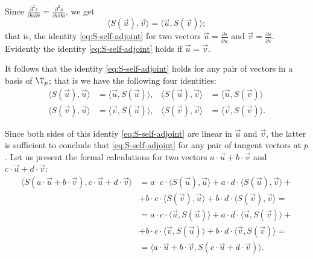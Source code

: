 Since $\tfrac{\partial^2 s}{\partial u\partial v}=\tfrac{\partial^2 s}{\partial v\partial u}$, we get
\[\langle S({\vec u}),\vec v\rangle=\langle {\vec u},S(\vec v)\rangle;\]
that is, the identity \ref{eq:S-self-adjoint} for two vectors $\vec u=\tfrac{\partial s}{\partial u}$ and $\vec v=\tfrac{\partial s}{\partial v}$.
Evidently the identity \ref{eq:S-self-adjoint} holds if $\vec u=\vec v$.

It follows that the identity \ref{eq:S-self-adjoint} holds for any pair of vectors in a basis of $\T_p$; that is we have the following four identities:
\begin{align*}
 \langle S({\vec u}),\vec u\rangle&=\langle {\vec u},S(\vec u)\rangle,
 &\langle S({\vec u}),\vec v\rangle&=\langle {\vec u},S(\vec v)\rangle
 \\
 \langle S({\vec v}),\vec u\rangle&=\langle {\vec v},S(\vec u)\rangle,
 &\langle S({\vec v}),\vec v\rangle&=\langle {\vec v},S(\vec v)\rangle.
\end{align*}

Since both sides of this identiy \ref{eq:S-self-adjoint} are linear in $\vec u$ and $\vec v$,
the latter is sufficient to conclude that \ref{eq:S-self-adjoint} for any pair of tangent vectors at $p$.
Let us present the formal calculations for two vectors $a\cdot \vec u+b\cdot\vec v$ and $c\cdot \vec u+d\cdot\vec v$:
\begin{align*} 
\langle S(a\cdot \vec u+b\cdot\vec v),c\cdot \vec u+d\cdot\vec v\rangle
&=a\cdot c\cdot\langle S({\vec u}),\vec u\rangle + a\cdot d\cdot \langle S({\vec u}),\vec v\rangle+
\\
&+b\cdot c\cdot\langle S({\vec v}),\vec u\rangle + b\cdot d\cdot \langle S({\vec v}),\vec v\rangle=
\\
&=a\cdot c\cdot\langle {\vec u},S(\vec u)\rangle + a\cdot d\cdot \langle {\vec u},S(\vec v)\rangle+
\\
&+b\cdot c\cdot\langle {\vec v},S(\vec u)\rangle + b\cdot d\cdot \langle {\vec v},S(\vec v)\rangle=
\\
&=\langle a\cdot \vec u+b\cdot\vec v,S(c\cdot \vec u+d\cdot\vec v)\rangle.
\end{align*}
\qedsf






























